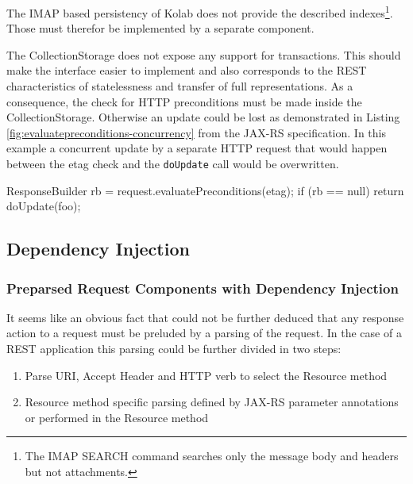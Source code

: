 \documentclass[11pt,a4paper,headsepline,twoside]{scrartcl}		%
\begin{document}
The IMAP based persistency of Kolab does not provide the described
indexes\footnote{The IMAP SEARCH command\cite[sec 6.4.4]{RFC3501} searches only
  the message body and headers but not attachments.}. Those must therefor be
implemented by a separate component.

The CollectionStorage does not expose any support for transactions. This should
make the interface easier to implement and also corresponds to the REST
characteristics of statelessness and transfer of full representations. As a
consequence, the check for HTTP preconditions must be made inside the
CollectionStorage. Otherwise an update could be lost as demonstrated in Listing
\ref{fig:evaluatepreconditions-concurrency} from the JAX-RS
specification\cite[p. 28]{JAX-RS1.1}. In this example a concurrent update by a
separate HTTP request that would happen between the etag check and the
\lstinline:doUpdate: call would be overwritten.

\begin{javalisting}[label=fig:evaluatepreconditions-concurrency,
                   float=htb,
                   caption={Potential lost-update problem with JAX-RS}]
ResponseBuilder rb = request.evaluatePreconditions(etag);
if (rb == null) return doUpdate(foo);
\end{javalisting}



\subsection{Dependency Injection}
\label{sec:dependency-injection}

\subsubsection{Preparsed Request Components with Dependency Injection}
\label{sec:prep-requ-comp}

It seems like an obvious fact that could not be further deduced that any
response action to a request must be preluded by a parsing of the request. In
the case of a REST application this parsing could be further divided in two
steps:
\begin{enumerate}
\item Parse URI, Accept Header and HTTP verb to select the Resource method
\item Resource method specific parsing defined by JAX-RS parameter annotations
  or performed in the Resource method
\end{enumerate}
\end{document}
